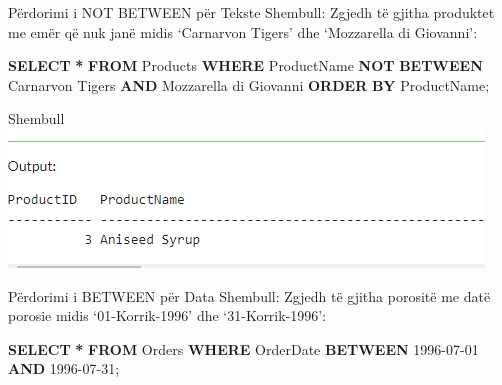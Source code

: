 \documentclass[
  ignorenonframetext,
]{beamer}
\newenvironment{Shaded}{\begin{snugshade}}{\end{snugshade}}
\newcommand{\KeywordTok}[1]{\textcolor[rgb]{0.13,0.29,0.53}{\textbf{#1}}}
\newcommand{\NormalTok}[1]{#1}
\newcommand{\OperatorTok}[1]{\textcolor[rgb]{0.81,0.36,0.00}{\textbf{#1}}}
\newcommand{\StringTok}[1]{\textcolor[rgb]{0.31,0.60,0.02}{#1}}
\begin{document}
\begin{frame}[fragile]{Përdorimi i NOT BETWEEN për Tekste}
\label{puxebrdorimi-i-not-between-puxebr-tekste}
Shembull: Zgjedh të gjitha produktet me emër që nuk janë midis
`Carnarvon Tigers' dhe `Mozzarella di Giovanni':


\begin{Shaded}
\begin{Highlighting}[]
\KeywordTok{SELECT} \OperatorTok{*}
\KeywordTok{FROM}\NormalTok{ Products}
\KeywordTok{WHERE}\NormalTok{ ProductName }\KeywordTok{NOT} \KeywordTok{BETWEEN} \StringTok{\textquotesingle{}Carnarvon Tigers\textquotesingle{}} \KeywordTok{AND} \StringTok{\textquotesingle{}Mozzarella di Giovanni\textquotesingle{}}
\KeywordTok{ORDER} \KeywordTok{BY}\NormalTok{ ProductName;}
\end{Highlighting}
\end{Shaded}
\end{frame}

\begin{frame}{Shembull}
\label{shembull-27}
\includegraphics{./Figs/query82.png}
\end{frame}

\begin{frame}[fragile]{Përdorimi i BETWEEN për Data}
\label{puxebrdorimi-i-between-puxebr-data}
Shembull: Zgjedh të gjitha porositë me datë porosie midis
`01-Korrik-1996' dhe `31-Korrik-1996':


\begin{Shaded}
\begin{Highlighting}[]
\KeywordTok{SELECT} \OperatorTok{*}
\KeywordTok{FROM}\NormalTok{ Orders}
\KeywordTok{WHERE}\NormalTok{ OrderDate }\KeywordTok{BETWEEN} \StringTok{\textquotesingle{}1996{-}07{-}01\textquotesingle{}} \KeywordTok{AND} \StringTok{\textquotesingle{}1996{-}07{-}31\textquotesingle{}}\NormalTok{;}
\end{Highlighting}
\end{Shaded}
\end{frame}
\end{document}
